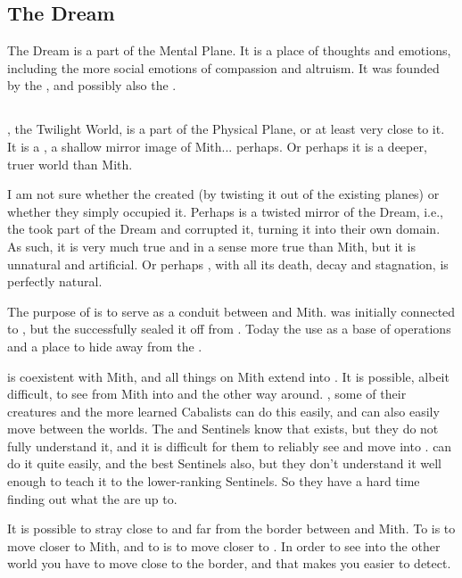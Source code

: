 \subsection{The Dream}
The Dream is a part of the Mental Plane. It is a place of  thoughts and emotions, including the more social emotions of compassion and altruism. It was founded by the \nycans{}, and possibly also the \nephilim. 

\subsection{\Nyx{}}
\Nyx{}, the Twilight World, is a part of the Physical Plane, or at least very close to it. 
It is a , a shallow mirror image of Mith... perhaps. Or perhaps it is a deeper, truer world than Mith. 

I am not sure whether the \banes{} created \Nyx{} (by twisting it out of the existing planes) or whether they simply occupied it. Perhaps \Nyx{} is a twisted mirror of the Dream, i.e., the \banes{} took part of the Dream and corrupted it, turning it into their own domain. As such, it is very much true and in a sense more true than Mith, but it is unnatural and artificial. Or perhaps \Nyx{}, with all its death, decay and stagnation, is perfectly natural. 

The purpose of \Nyx{} is to serve as a conduit between \Erebos{} and Mith. \Nyx{} was initially connected to \Erebos{}, but the \dragons{} successfully sealed it off from \Erebos{}. Today the \banes{} use \Nyx{} as a base of operations and a place to hide away from the \dragons{}. 

\Nyx{} is coexistent with Mith, and all things on Mith extend into \Nyx{}. %
It is possible, albeit difficult, to see from Mith into \Nyx{} and the other way around. \Banes{}, some of their creatures and the more learned Cabalists can do this easily, and can also easily move between the worlds. 
The \dragons{} and Sentinels know that \Nyx{} exists, but they do not fully understand it, and it is difficult for them to reliably see and move into \Nyx{}. \dragons{} can do it quite easily, and the best Sentinels also, but they don't understand it well enough to teach it to the lower-ranking Sentinels. So they have a hard time finding out what the \banes{} are up to. 

It is possible to stray close to and far from the border between \Nyx{} and Mith. To  is to move closer to Mith, and to  is to move closer to \Nyx{}. In order to see into the other world you have to move close to the border, and that makes you easier to detect. 

